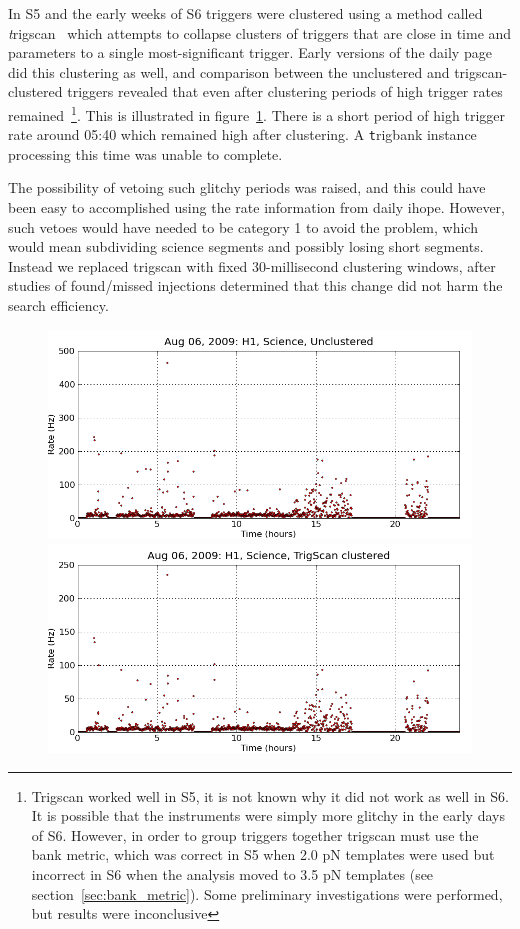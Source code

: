 In S5 and the early weeks of S6 triggers were clustered using a method
called {\emph trigscan}~\cite{SenguptaTrigScan:2008} which attempts to
collapse clusters of triggers that are close in time and parameters to
a single most-significant trigger.  Early versions of the daily page
did this clustering as well, and comparison between the unclustered
and trigscan-clustered triggers revealed that even after clustering
periods of high trigger rates remained~\footnote{Trigscan worked well
in S5, it is not known why it did not work as well in S6.  It is
possible that the instruments were simply more glitchy in the early
days of S6.  However, in order to group triggers together trigscan
must use the bank metric, which was correct in S5 when 2.0 pN
templates were used but incorrect in S6 when the analysis moved to 3.5
pN templates (see section~\ref{sec:bank_metric}).  Some preliminary
investigations were performed, but results were inconclusive}.  This
is illustrated in figure~\ref{f:daily_ihope_high_rates}.  There is a
short period of high trigger rate around 05:40 which remained high
after clustering.  A {\texttt trigbank} instance processing this time was
unable to complete.

The possibility of vetoing such glitchy periods was raised, and this
could have been easy to accomplished using the rate information from
daily ihope.  However, such vetoes would have needed to be category 1 to
avoid the problem, which would mean subdividing science segments and
possibly losing short segments.  Instead we replaced trigscan with
fixed 30-millisecond clustering windows, after studies of found/missed
injections determined that this change did not harm the search
efficiency. 

\begin{figure}
  \includegraphics[width=0.5\linewidth]{figures/detchar/20090806_H1_0_UNCLUSTERED_rate_vs_time}
  \includegraphics[width=0.5\linewidth]{figures/detchar/20090806_H1_0_TS_CLUSTERED_rate_vs_time}
  \caption[Problematic times identified by daily ihope]{
  \label{f:daily_ihope_high_rates}
}
\end{figure}%

